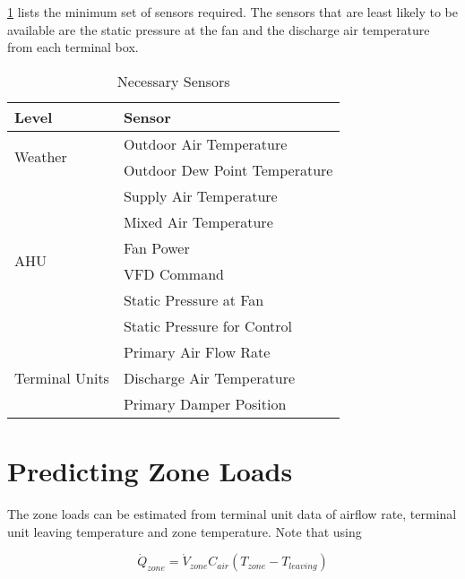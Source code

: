 \tableref{} \ref{tab:NecessarySensors} lists the minimum set of sensors required. The sensors that are least likely to be available are the static pressure at the fan and the discharge air temperature from each terminal box.

\begin{table}
\centering
\begin{tabular}{l l}
\toprule

Level & Sensor \\
\midrule\midrule
\multirow{2}{*}{Weather} & Outdoor Air Temperature \\
 & Outdoor Dew Point Temperature \\
 
 \midrule
 
\multirow{6}{*}{AHU} & Supply Air Temperature      \\
                     & Mixed Air Temperature       \\
                     & Fan Power                   \\
                     & VFD Command                 \\
                     & Static Pressure at Fan      \\
                     & Static Pressure for Control \\
\midrule
\multirow{4}{*}{Terminal Units}  & Primary Air Flow Rate     \\
                                 & Discharge Air Temperature \\
                                 & Primary Damper Position   \\

\bottomrule

\end{tabular}
\caption{Necessary Sensors}
\label{tab:NecessarySensors}
\end{table}

\section{Predicting Zone Loads}

The zone loads can be estimated from terminal unit data of airflow rate, terminal unit leaving temperature and zone temperature. Note that using 

\begin{equation}
\dot Q_{zone} = \dot V_{zone} C_{air} \left(T_{zone}-T_{leaving} \right)
\end{equation}

